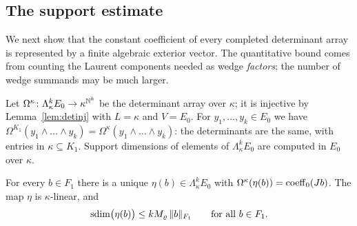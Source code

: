 \subsection{The support estimate}\label{ssec:suppest}
We next show that the constant coefficient of every completed determinant array is represented by a finite
algebraic exterior vector. The quantitative bound comes from counting the Laurent components needed as wedge
\emph{factors}; the number of wedge summands may be much larger.

Let $\Omega^\kappa\colon\Lambda^k_\kappa E_0\to\kappa^{\mathbb N^k}$ be the determinant array over $\kappa$; it is injective by
Lemma~\ref{lem:detinj} with $L=\kappa$ and $V=E_0$. For $y_1,\dots,y_k\in E_0$ we have
$\Omega^{K_1}(y_1\wedge\dots\wedge y_k)=\Omega^\kappa(y_1\wedge\dots\wedge y_k)$: the determinants are the same, with entries in
$\kappa\subseteq K_1$. Support dimensions of elements of $\Lambda^k_\kappa E_0$ are computed in $E_0$ over $\kappa$.

\begin{proposition}\label{prop:supp}
For every $b\in F_1$ there is a unique $\eta(b)\in\Lambda^k_\kappa E_0$ with $\Omega^\kappa(\eta(b))=\operatorname{coeff}_0(Jb)$. The map $\eta$ is
$\kappa$\nobreakdash-linear, and
\begin{equation}\label{eq:suppest}
\operatorname{sdim}\bigl(\eta(b)\bigr)\le kM_\varrho\,\lVert b\rVert_{F_1}\qquad\text{for all }b\in F_1 .
\end{equation}
\end{proposition}

